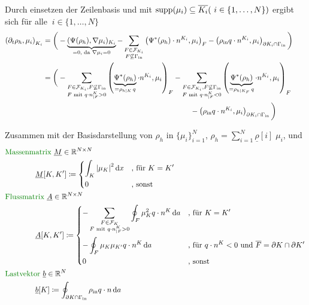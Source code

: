 Durch einsetzen der Zeilenbasis und mit $ \operatorname{supp}(\mu_i) \subseteq \overline{K_i} (\ i \in \{1, \dots , N\})$ ergibt sich für alle $\ i \in \{1, \dots , N\}$ 
\begin{align*}
	\left(\partial_t \rho_h, \mu_i  \right)_{K_i}  &= \bigg( -\underbrace{(\Psi(\rho_h), \nabla\mu_i)_{K_i}}_{=0 \text{, da } \nabla \mu_i = 0} - \sum_{\substack{F \in \mathcal{F}_{K_i} \\ F \not\subseteq \Gamma_{{\text{in}}}}} \left(\Psi^*(\rho_h) \cdot n^{K_i}, \mu_i \right)_{F} - \left(\rho_{\text{in}} q \cdot n^{K_i}, \mu_i \right)_{\partial K_i \cap \Gamma_{{\text{in}}}} \bigg) \\
	&= \bigg( - \sum_{\substack{F \in \mathcal{F}_{K_i}, F \not\subseteq \Gamma_{{\text{in}}}\\ F \text{ mit }q \cdot n^K_{|F} > 0} } \left(\underbrace{\Psi^*(\rho_h)}_{= \rho_{h|K}\, q} \cdot n^{K_i}, \mu_i \right)_{F} - \sum_{\substack{F \in \mathcal{F}_{K_i}, F \not\subseteq \Gamma_{{\text{in}}}\\ F \text{ mit }q \cdot n^K_{|F} < 0} } \left(\underbrace{\Psi^*(\rho_h)}_{= \rho_{h|K_F} \, q} \cdot n^{K_i}, \mu_i \right)_{F}\\
	& \qquad \qquad \qquad \qquad \qquad \qquad  \qquad \qquad\qquad \qquad- \left(\rho_{\text{in}} q \cdot n^{K_i}, \mu_i \right)_{\partial K_i \cap \Gamma_{{\text{in}}}} \bigg)\qquad \qquad
\end{align*} 

Zusammen mit der Basisdarstellung von $ \rho_h $ in $\{\mu_i  \}_{i=1}^N$, $ \rho_h = \sum_{i=1}^{N} \underline{\rho}[i] \; \mu_i$, und 
\begin{align*}
&\text{\defi{Massenmatrix} } \underline{M}\in \R^{N \times N} \\  &\qquad \qquad \underline{M}[K,K'] \coloneqq \begin{dcases}
\int_K \abs{\mu_K}^2 \diff x & \text{, für } K = K' \\
0 &\text{, sonst}
\end{dcases} \\
&\text{\defi{Flussmatrix} } \underline{A}\in \R^{N \times N} \\ &\qquad \qquad \underline{A}[K,K'] \coloneqq \begin{dcases}
- \sum_{\substack{F\in \mathcal{F}_K \\ F \text{ mit } q\cdot n^K_{|F} > 0}} \oint_F \mu_K^2 q \cdot n^K \diff a& \text{, für } K = K' \\
- \oint_F \mu_K \mu_{K'} q \cdot n^K \diff a &\text{, für } q \cdot n^K< 0 \text{ und } \overline{F} = \partial K \cap \partial K'\\
0 &\text{, sonst}
\end{dcases} \\
&\text{\defi{Lastvektor} } \underline{b}\in \R^{N} \\ &\qquad \qquad\underline{b}[K] \coloneqq \oint_{\partial K \cap \Gammain} \rhoin q \cdot n \diff a
\end{align*}


